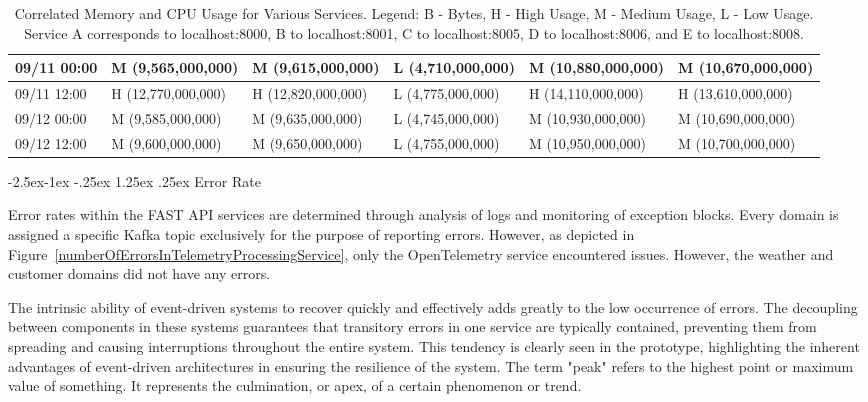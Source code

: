 \documentclass[preprint,12pt]{elsarticle}
\makeatletter
\renewcommand\paragraph{\@startsection{paragraph}{4}{\z@}%
            {-2.5ex\@plus -1ex \@minus -.25ex}%
            {1.25ex \@plus .25ex}%
            {\normalfont\normalsize\itshape}}
\makeatother
\begin{document}
\begin{table}[htbp]
{\begin{tabular}{|l|l|l|l|l|l|}
        \hline
        09/11 00:00 & M (9,565,000,000) & M (9,615,000,000) & L (4,710,000,000) & M (10,880,000,000) & M (10,670,000,000) \\
        \hline
        09/11 12:00 & H (12,770,000,000) & H (12,820,000,000) & L (4,775,000,000) & H (14,110,000,000) & H (13,610,000,000) \\
        \hline
        09/12 00:00 & M (9,585,000,000) & M (9,635,000,000) & L (4,745,000,000) & M (10,930,000,000) & M (10,690,000,000) \\
        \hline
        09/12 12:00 & M (9,600,000,000) & M (9,650,000,000) & L (4,755,000,000) & M (10,950,000,000) & M (10,700,000,000) \\
        \hline
      \end{tabular}%
    }
    \caption{Correlated Memory and CPU Usage for Various Services. Legend: B - Bytes, H - High Usage, M - Medium Usage, L - Low Usage. Service A corresponds to localhost:8000, B to localhost:8001, C to localhost:8005, D to localhost:8006, and E to localhost:8008.}
    \label{table:memory-cpu-correlation}
\end{table}



\paragraph{Error Rate}

Error rates within the FAST API services are determined through analysis of logs and monitoring of exception blocks. Every domain is assigned a specific Kafka topic exclusively for the purpose of reporting errors. However, as depicted in Figure~\ref{numberOfErrorsInTelemetryProcessingService}, only the OpenTelemetry service encountered issues. However, the weather and customer domains did not have any errors.

The intrinsic ability of event-driven systems to recover quickly and effectively adds greatly to the low occurrence of errors. The decoupling between components in these systems guarantees that transitory errors in one service are typically contained, preventing them from spreading and causing interruptions throughout the entire system. This tendency is clearly seen in the prototype, highlighting the inherent advantages of event-driven architectures in ensuring the resilience of the system. The term "peak" refers to the highest point or maximum value of something. It represents the culmination, or apex, of a certain phenomenon or trend.
\end{document}

